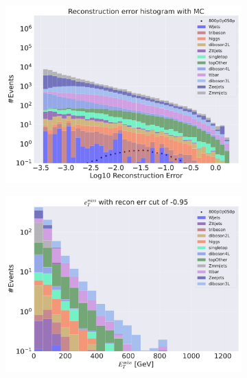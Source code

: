 \begin{figure}[H]
    \centering
    \begin{subfigure}{.49\textwidth}
        \includegraphics[width=\textwidth]{Figures/AE_testing/big/3lep/b_data_recon_big_rm3_feats_sig_800p0p050p.pdf}
        \caption{ }
        \label{fig:AE_3lep_big_800_2}
    \end{subfigure}
    \hfill
    \begin{subfigure}{.49\textwidth}
        \includegraphics[width=\textwidth]{Figures/AE_testing/big/3lep/b_data_recon_big_rm3_feats_sig_800p0p050p_etmiss_recon_errcut_-0.95.pdf}
        \caption{}
        \label{fig:AE_3lep_big_etmiss_800_2}
    \end{subfigure}

\end{figure}
